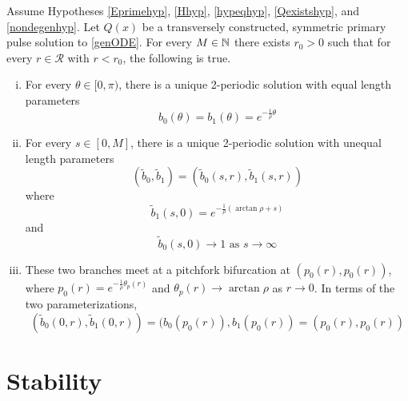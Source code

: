 \documentclass[thesis.tex]{subfiles}
\begin{document}
\begin{theorem}\label{2pulsebifurcation}
Assume Hypotheses \ref{Eprimehyp}, \ref{Hhyp}, \ref{hypeqhyp}, \ref{Qexistshyp}, and \ref{nondegenhyp}. Let $Q(x)$ be a transversely constructed, symmetric primary pulse solution to \eqref{genODE}. For every $M \in {\mathbb N}$ there exists $r_0 > 0$ such that for every $r \in \mathcal{R}$ with $r < r_0$, the following is true.
\begin{enumerate}[(i)]
	\item For every $\theta \in [0, \pi)$, there is a unique 2-periodic solution with equal length parameters 
	\[
	b_0(\theta) = b_1(\theta) = e^{-\frac{1}{\rho}\theta}
	\]
	\item For every $s \in [0, M]$, there is a unique 2-periodic solution with unequal length parameters
	\[
	(\tilde{b}_0, \tilde{b}_1) = (\tilde{b}_0(s, r), \tilde{b}_1(s, r))
	\]
	where
	\[
	\tilde{b}_1(s, 0) = e^{-\frac{1}{\rho}(\arctan \rho + s)}
	\]
	and
	\[
	\tilde{b}_0(s, 0) \rightarrow 1 \text{ as } s \rightarrow \infty
	\]
	\item These two branches meet at a pitchfork bifurcation at $(p_0(r), p_0(r))$, where $p_0(r) = e^{-\frac{1}{\rho}\theta_p(r)}$ and $\theta_p(r) \rightarrow \arctan \rho$ as $r \rightarrow 0$. In terms of the two parameterizations,
	\[
	(\tilde{b}_0(0, r), \tilde{b}_1(0, r)) = (b_0(p_0(r)), b_1(p_0(r)) 
	= (p_0(r), p_0(r))
	\]
\end{enumerate}
\end{theorem}

\section{Stability}
\end{document}
